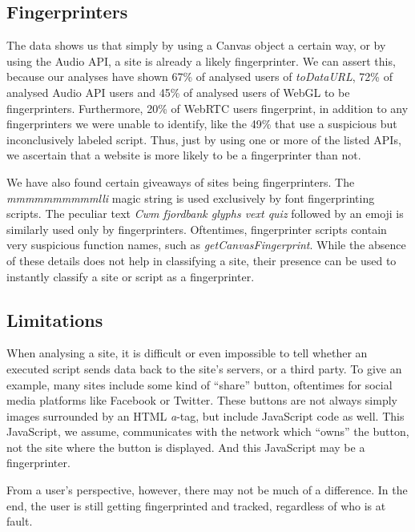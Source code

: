\documentclass[
    fontsize=12pt,
    headings=small,
    parskip=half,
    bibliography=totoc,
    numbers=noenddot,
    open=any
    ]{scrreprt}
\begin{document}
\subsection{Fingerprinters}
The data shows us that simply by using a Canvas object a certain way, or by using the Audio API,
a site is already a likely fingerprinter. We can assert this, because our analyses have shown
67\% of analysed users of \textit{toDataURL}, 72\% of analysed Audio API users and 45\%
of analysed users of WebGL to be fingerprinters.
Furthermore, 20\% of WebRTC users fingerprint, in addition to any fingerprinters we were unable
to identify, like the 49\% that use a suspicious but inconclusively labeled script.
Thus, just by using one or more of the listed APIs, we ascertain that a website is more likely
to be a fingerprinter than not.

We have also found certain giveaways of sites being fingerprinters.
The \textit{mmmmmmmmmmlli} magic string is used exclusively by font fingerprinting scripts.
The peculiar text \textit{Cwm fjordbank glyphs vext quiz} followed by an emoji is similarly used only
by fingerprinters.
Oftentimes, fingerprinter scripts contain very suspicious function names, such as \textit{getCanvasFingerprint}.
While the absence of these details does not help in classifying a site,
their presence can be used to instantly classify a site or script as a fingerprinter.


\subsection{Limitations}
When analysing a site, it is difficult or even impossible to tell whether an executed
script sends data back to the site's servers, or a third party.
To give an example, many sites include some kind of ``share'' button,
oftentimes for social media platforms like Facebook or Twitter.
These buttons are not always simply images surrounded by an HTML \textit{a}-tag,
but include JavaScript code as well.
This JavaScript, we assume, communicates with the network which ``owns''
the button, not the site where the button is displayed.
And this JavaScript may be a fingerprinter.

From a user's perspective, however, there may not be much of a difference.
In the end, the user is still getting fingerprinted and tracked, regardless
of who is at fault.


\end{document}
